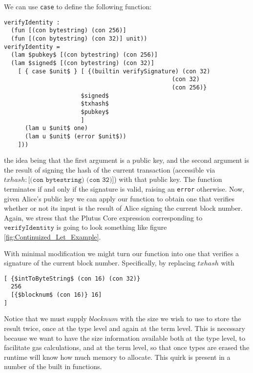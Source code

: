 \documentclass[../plutus-core-specification.tex]{subfiles}
\begin{document}
We can use \texttt{case} to define the following function:
\begin{lstlisting}[basicstyle=\ttfamily,mathescape]
verifyIdentity :
  (fun [(con bytestring) (con 256)]
  (fun [(con bytestring) (con 32)] unit))
verifyIdentity =
  (lam $pubkey$ [(con bytestring) (con 256)]
  (lam $signed$ [(con bytestring) (con 32)]
    [ { case $unit$ } [ {(builtin verifySignature) (con 32)
                                                (con 32)
                                                (con 256)}
                      $signed$
                      $txhash$
                      $pubkey$
                      ]
      (lam u $unit$ one)
      (lam u $unit$ (error $unit$))
    ]))
\end{lstlisting}
the idea being that the first argument is a public key, and the second
argument is the result of signing the hash of the current transaction
(accessible via $txhash : \texttt{[(con bytestring) (con 32)]}$) with
that public key. The function terminates if and only if the signature
is valid, raising an \texttt{error} otherwise. Now, given Alice's
public key we can apply our function to obtain one that verifies
whether or not its input is the result of Alice signing the current
block number. Again, we stress that the Plutus Core expression
corresponding to $\texttt{verifyIdentity}$ is going to look something
like figure \ref{fig:Continuized_Let_Example}.

With minimal modification we might turn our function into one that
verifies a signature of the current block number. Specifically, by
replacing $txhash$ with
\begin{lstlisting}[basicstyle=\ttfamily,mathescape]
[ {$intToByteString$ (con 16) (con 32)}
  256
  [{$blocknum$ (con 16)} 16]
]
\end{lstlisting}

Notice that we must supply $blocknum$ with the size we wish to use to
store the result twice, once at the type level and again at the term
level. This is necessary because we want to have the size information
available both at the type level, to facilitate gas calculations, and
at the term level, so that once types are erased the runtime will know
how much memory to allocate. This quirk is present in a number of the
built in functions.
\end{document}
